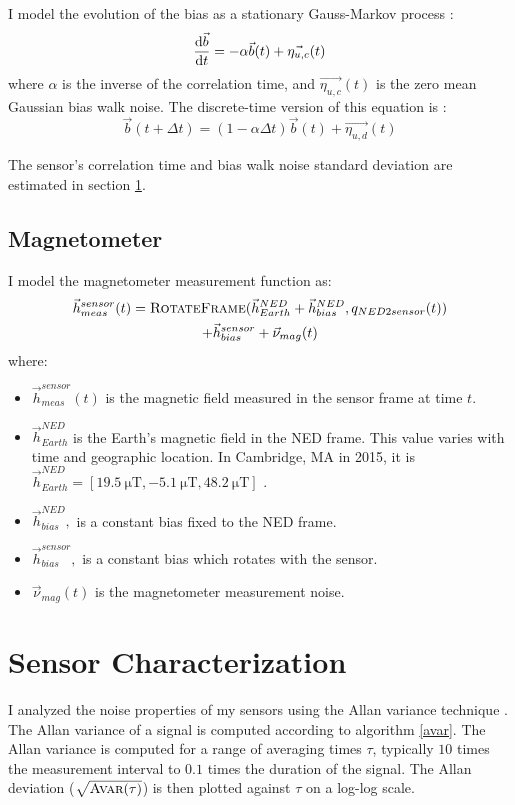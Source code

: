 \documentclass[conference]{IEEEtran}
\begin{document}
I model the evolution of the bias as a stationary Gauss-Markov process \cite{1642588, park}:
\begin{equation}
  \dv{\vec{b}}{t} = - \alpha \vec{b}(t) + \vec{\eta_{u,c}}(t)
\end{equation}
where $\alpha$ is the inverse of the correlation time, and $\vec{\eta_{u,c}}(t)$ is the zero mean Gaussian bias walk noise. The discrete-time version of this equation is \cite{1642588}:
\begin{equation}
  \vec{b}(t + \Delta t) = (1 - \alpha \Delta t) \vec{b}(t) + \vec{\eta_{u,d}}(t)
\end{equation}

The sensor's correlation time and bias walk noise standard deviation are estimated in section \ref{sensor_char}.


\subsection{Magnetometer}
I model the magnetometer measurement function as:
\begin{multline}
  \vec{h}_{meas}^{sensor}(t) = \textproc{RotateFrame}(\vec{h}_{Earth}^{NED} + \vec{h}_{bias}^{NED}, q_{NED2sensor}(t)) \\
  + \vec{h}_{bias}^{sensor} + \vec{\nu}_{mag}(t)
\end{multline}
where:
\begin{itemize}
  \item $\vec{h}_{meas}^{sensor}(t)$ is the magnetic field measured in the sensor frame at time $t$.
  \item $\vec{h}_{Earth}^{NED}$ is the Earth's magnetic field in the NED frame. This value varies with time and geographic location. In Cambridge, MA in 2015, it is $\vec{h}_{Earth}^{NED} = [\SI{19.5}{\micro\tesla}, \SI{-5.1}{\micro\tesla}, \SI{48.2}{\micro\tesla}]$ \cite{wmm}.
  \item $\vec{h}_{bias}^{NED},$ is a constant bias fixed to the NED frame.
  \item $\vec{h}_{bias}^{sensor},$ is a constant bias which rotates with the sensor.
  \item $\vec{\nu}_{mag}(t)$ is the magnetometer measurement noise.
\end{itemize}


\section{Sensor Characterization}
\label{sensor_char}
I analyzed the noise properties of my sensors using the Allan variance technique \cite{UCAM-CL-TR-696}. The Allan variance of a signal is computed  according to algorithm \ref{avar}. The Allan variance is computed for a range of averaging times $\tau$, typically $10$ times the measurement interval to $0.1$ times the duration of the signal. The Allan deviation ($\sqrt{\textproc{Avar}(\tau)}$) is then plotted against $\tau$ on a log-log scale.\\
\end{document}
